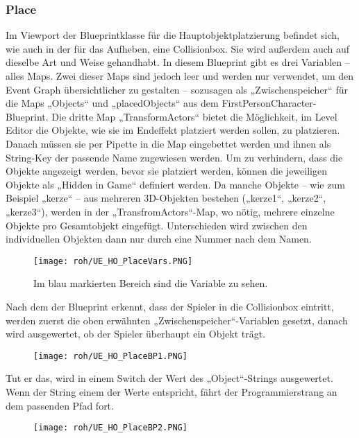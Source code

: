 \subsubsection{Place}
Im Viewport der Blueprintklasse für die Hauptobjektplatzierung befindet sich, wie auch in der für das Aufheben, eine Collisionbox. Sie wird außerdem auch auf dieselbe Art und Weise gehandhabt.
In diesem Blueprint gibt es drei Variablen – alles Maps. Zwei dieser Maps sind jedoch leer und werden nur verwendet, um den Event Graph übersichtlicher zu gestalten – sozusagen als „Zwischenspeicher“ für die Maps „Objects“ und „placedObjects“ aus dem FirstPersonCharacter-Blueprint.
Die dritte Map „TransformActors“ bietet die Möglichkeit, im Level Editor die Objekte, wie sie im Endeffekt platziert werden sollen, zu platzieren. Danach müssen sie per Pipette in die Map eingebettet werden und ihnen als String-Key der passende Name zugewiesen werden. Um zu verhindern, dass die Objekte angezeigt werden, bevor sie platziert werden, können die jeweiligen Objekte als „Hidden in Game“ definiert werden.
Da manche Objekte – wie zum Beispiel „kerze“ – aus mehreren 3D-Objekten bestehen („kerze1“, „kerze2“, „kerze3“), werden in der „TransfromActors“-Map, wo nötig, mehrere einzelne Objekte pro Gesamtobjekt eingefügt. Unterschieden wird zwischen den individuellen Objekten dann nur durch eine Nummer nach dem Namen.
\begin{figure}[H]
    \centering
    \texttt{[image: roh/UE\_HO\_PlaceVars.PNG]}
    \caption{Im blau markierten Bereich sind die Variable zu sehen.}
    \label{UE:HO_PlaceVars}
\end{figure}
Nach dem der Blueprint erkennt, dass der Spieler in die Collisionbox eintritt, werden zuerst die oben erwähnten „Zwischenspeicher“-Variablen gesetzt, danach wird ausgewertet, ob der Spieler überhaupt ein Objekt trägt.
\begin{figure}[H]
    \centering
    \texttt{[image: roh/UE\_HO\_PlaceBP1.PNG]}
    \label{UE:HO_PlaceBP1}
\end{figure}
Tut er das, wird in einem Switch der Wert des „Object“-Strings ausgewertet. Wenn der String einem der Werte entspricht, fährt der Programmierstrang an dem passenden Pfad fort.
\begin{figure}[H]
    \centering
    \texttt{[image: roh/UE\_HO\_PlaceBP2.PNG]}
    \label{UE:HO_PlaceBP2_3_1}
\end{figure}


